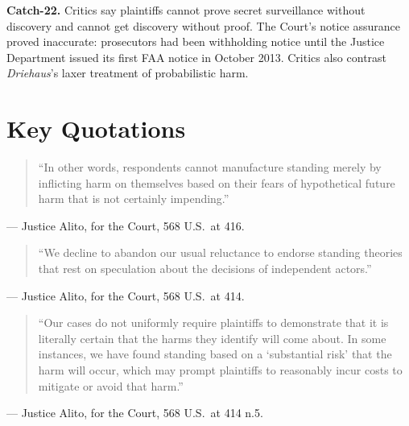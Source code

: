 \documentclass[12pt]{article}
\begin{document}
\textbf{Catch-22.} Critics say plaintiffs cannot prove secret surveillance without discovery and cannot get discovery without proof. The Court's notice assurance proved inaccurate: prosecutors had been withholding notice until the Justice Department issued its first FAA notice in October 2013. Critics also contrast \textit{Driehaus}'s laxer treatment of probabilistic harm.

\section{Key Quotations}

\begin{quote}
``In other words, respondents cannot manufacture standing merely by inflicting harm on themselves based on their fears of hypothetical future harm that is not certainly impending.''
\end{quote}
\noindent --- Justice Alito, for the Court, 568 U.S.\ at 416.

\begin{quote}
``We decline to abandon our usual reluctance to endorse standing theories that rest on speculation about the decisions of independent actors.''
\end{quote}
\noindent --- Justice Alito, for the Court, 568 U.S.\ at 414.

\begin{quote}
``Our cases do not uniformly require plaintiffs to demonstrate that it is literally certain that the harms they identify will come about. In some instances, we have found standing based on a `substantial risk' that the harm will occur, which may prompt plaintiffs to reasonably incur costs to mitigate or avoid that harm.''
\end{quote}
\noindent --- Justice Alito, for the Court, 568 U.S.\ at 414 n.5.
\end{document}
